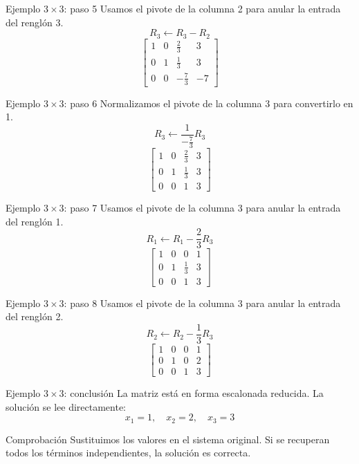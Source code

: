 \documentclass[aspectratio=169,9pt]{beamer}
\theoremstyle{remark}
\begin{document}
\begin{frame}[t]{Ejemplo $3\times3$: paso 5}
Usamos el pivote de la columna 2 para anular la entrada del renglón 3.
\[
R_{3}\leftarrow R_{3}-R_{2}
\]
\[
\left[\begin{array}{ccc|c}
1 & 0 & \frac{2}{3} & 3\\
0 & 1 & \frac{1}{3} & 3\\
0 & 0 & - \frac{7}{3} & -7
\end{array}\right]
\]
\end{frame}
\begin{frame}[t]{Ejemplo $3\times3$: paso 6}
Normalizamos el pivote de la columna 3 para convertirlo en 1.
\[
R_{3}\leftarrow \frac{1}{- \frac{7}{3}}R_{3}
\]
\[
\left[\begin{array}{ccc|c}
1 & 0 & \frac{2}{3} & 3\\
0 & 1 & \frac{1}{3} & 3\\
0 & 0 & 1 & 3
\end{array}\right]
\]
\end{frame}
\begin{frame}[t]{Ejemplo $3\times3$: paso 7}
Usamos el pivote de la columna 3 para anular la entrada del renglón 1.
\[
R_{1}\leftarrow R_{1}-\frac{2}{3}R_{3}
\]
\[
\left[\begin{array}{ccc|c}
1 & 0 & 0 & 1\\
0 & 1 & \frac{1}{3} & 3\\
0 & 0 & 1 & 3
\end{array}\right]
\]
\end{frame}
\begin{frame}[t]{Ejemplo $3\times3$: paso 8}
Usamos el pivote de la columna 3 para anular la entrada del renglón 2.
\[
R_{2}\leftarrow R_{2}-\frac{1}{3}R_{3}
\]
\[
\left[\begin{array}{ccc|c}
1 & 0 & 0 & 1\\
0 & 1 & 0 & 2\\
0 & 0 & 1 & 3
\end{array}\right]
\]
\end{frame}
\begin{frame}[t]{Ejemplo $3\times3$: conclusión}
La matriz está en forma escalonada reducida. La solución se lee directamente:
\[
\boxed{x_{1}=1,\quad x_{2}=2,\quad x_{3}=3}
\]
\begin{block}{Comprobación}
Sustituimos los valores en el sistema original. Si se recuperan todos los términos independientes, la solución es correcta.
\end{block}
\end{frame}
\end{document}
